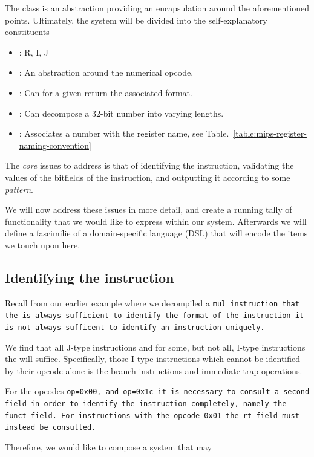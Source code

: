 The  class is an abstraction providing an
encapsulation around the aforementioned points. Ultimately, the system
will be divided into the self-explanatory constituents

\begin{itemize}
\item \formatm: R, I, J
\item \opcodem: An abstraction around the numerical opcode.
\item \formatm: Can for a given \opcodem return the associated format.
\item \decomposedm: Can decompose a 32-bit number into varying lengths.
\item \registerm: Associates a number with the register name, 
      see Table.~\ref{table:mips-register-naming-convention}
\end{itemize}

The \emph{core} issues to address is that of identifying the
instruction, validating the values of the bitfields of the
instruction, and outputting it according to some \emph{pattern}.

We will now address these issues in more detail, and create a running
tally of functionality that we would like to express within our
system. Afterwards we will define a fascimilie of a domain-specific
language (DSL) that will encode the items we touch upon here.

\subsection{Identifying the instruction}\label{section:identification}

Recall from our earlier example where we decompiled a \tt{mul}
instruction that the \opcode is always sufficient to identify
the format of the instruction it is not always sufficent to
identify an instruction uniquely.

We find that all J-type instructions and for some, but not all, I-type
instructions the \opcode will suffice. Specifically, those I-type
instructions which cannot be identified by their opcode alone is the
branch instructions and immediate trap operations.

For the opcodes \tt{op=0x00}, and \tt{op=0x1c} it is necessary to
consult a second field in order to identify the instruction
completely, namely the \tt{funct} field. For instructions with the
opcode \tt{0x01} the \tt{rt} field must instead be consulted.

Therefore, we would like to compose a system that may

